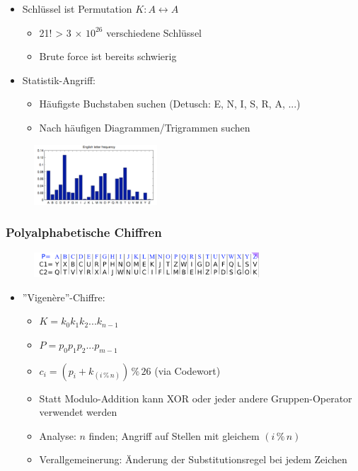 \documentclass[openany]{book}
\begin{document}
\begin{itemize}
    \item Schlüssel ist Permutation $K:A\leftrightarrow A$
    \begin{itemize}
        \item 21! > 3 $\times$ $10^26$ verschiedene Schlüssel
        \item Brute force ist bereits schwierig
    \end{itemize}
    \item Statistik-Angriff:
    \begin{itemize}
        \item Häufigste Buchstaben suchen (Detusch: E, N, I, S, R, A, ...)
        \item Nach häufigen Diagrammen/Trigrammen suchen
    \end{itemize}
\end{itemize}

\begin{figure}[h!]
    \centering
    \includegraphics[width=0.41\textwidth]{Pics/Substitution2.PNG}
\end{figure}

\subsubsection{Polyalphabetische Chiffren}

\begin{figure}[h!]
    \centering
    \includegraphics[width=0.75\textwidth]{Pics/PolyAlpha.PNG}
\end{figure}

\begin{itemize}
    \item ''Vigenère''-Chiffre:
    \begin{itemize}
        \item $K=k_0k_1k_2...k_{n-1}$
        \item $P=p_0p_1p_2...p_{m-1}$
        \item $c_i=(p_i+k_{(i\, \% \, n)})\, \% \, 26$ (via Codewort)
        \item Statt Modulo-Addition kann XOR oder jeder andere Gruppen-Operator verwendet werden
        \item Analyse: $n$ finden; Angriff auf Stellen mit gleichem $(i\, \% \, n)$
        \item Verallgemeinerung: Änderung der Substitutionsregel bei jedem Zeichen
    \end{itemize}
\end{itemize}
\end{document}
